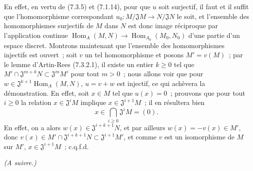 En effet, en vertu de (7.3.5) et (7.1.14), pour que $u$ soit surjectif, il
faut et il suffit que l'homomorphisme correspondant
$u_0:M/\mathfrak JM\to N/\mathfrak JN$ le soit, et l'ensemble des
homomorphismes surjectifs de $M$ dans $N$ est donc image réciproque par
l'application continue $\operatorname{Hom}_A(M,N)\to\operatorname{Hom}_{A_0}(M_0,N_0)$ d'une partie
d'un espace discret. Montrons maintenant que l'ensemble des homomorphismes
injectifs est ouvert~; soit $v$ un tel homomorphisme et posons $M'=v(M)$~;
par le lemme d'Artin-Rees (7.3.2.1), il existe un entier $k\geq 0$ tel que
$M'\cap\mathfrak J^{m+k}N\subset\mathfrak J^mM'$ pour tout $m>0$~; nous
allons voir que pour $w\in\mathfrak J^{k+1}\operatorname{Hom}_A(M,N)$,
$u=v+w$ est injectif, ce qui achèvera la démonstration. En effet, soit
$x\in M$ tel que $u(x)=0$~; prouvons que pour tout $i\geq 0$ la relation
$x\in\mathfrak J^iM$ implique $x\in\mathfrak J^{i+1}M$~; il en résultera
bien
\[
  x\in\bigcap_{i\geq 0}\mathfrak J^iM=(0).
\]
En effet, on a alors $w(x)\in\mathfrak J^{i+k+1}N$, et par ailleurs
$w(x)=-v(x)\in M'$, donc
$v(x)\in M'\cap\mathfrak J^{i+k+1}N\subset\mathfrak J^{i+1}M'$, et comme
$v$ est un isomorphisme de $M$ sur $M'$, $x\in\mathfrak J^{i+1}M$~;
c.q.f.d.

\begin{flushright}
\emph{(A suivre.)}
\end{flushright}

